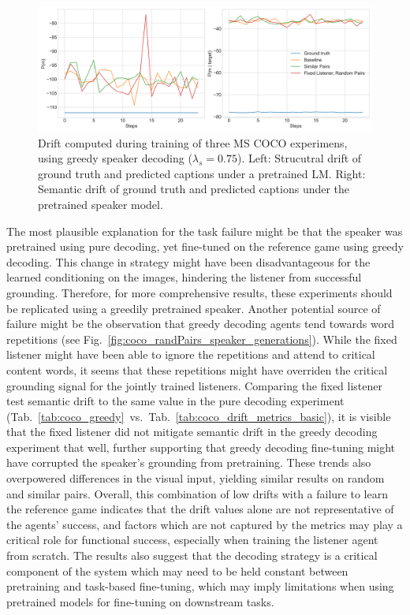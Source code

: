 \begin{figure}
	\centering
	\includegraphics[width=\linewidth]{images/coco_structural_semantic_drift_greedy_all_4000_pure_075.png}
	\caption{Drift computed during training of three MS COCO experimens, using greedy speaker decoding ($\lambda_s = 0.75$). Left: Strucutral drift of ground truth and predicted captions under a pretrained LM. Right: Semantic drift of ground truth and predicted captions under the pretrained speaker model.}
	\label{fig:coco_greedy_drifts}
\end{figure} 

The most plausible explanation for the task failure might be that the speaker was pretrained using pure decoding, yet fine-tuned on the reference game using greedy decoding. This change in strategy might have been disadvantageous for the learned conditioning on the images, hindering the listener from successful grounding. Therefore, for more comprehensive results, these experiments should be replicated using a greedily pretrained speaker. Another potential source of failure might be the observation that greedy decoding agents tend towards word repetitions \parencite[cf.][]{lee2019countering} (see Fig.~\ref{fig:coco_randPairs_speaker_generations}). While the fixed listener might have been able to ignore the repetitions and attend to critical content words, it seems that these repetitions might have overriden the critical grounding signal for the jointly trained listeners. Comparing the fixed listener test semantic drift to the same value in the pure decoding experiment (Tab.~\ref{tab:coco_greedy}~vs.~Tab.~\ref{tab:coco_drift_metrics_basic}), it is visible that the fixed listener did not mitigate semantic drift in the greedy decoding experiment that well, further supporting that greedy decoding fine-tuning might have corrupted the speaker's grounding from pretraining. 
These trends also overpowered differences in the visual input, yielding similar results on random and similar pairs.
Overall, this combination of low drifts with a failure to learn the reference game indicates that the drift values alone are not representative of the agents' success, and factors which are not captured by the metrics may play a critical role for functional success, especially when training the listener agent from scratch. The results also suggest that the decoding strategy is a critical component of the system which may need to be held constant between pretraining and task-based fine-tuning, which may imply limitations when using pretrained models for fine-tuning on downstream tasks.

